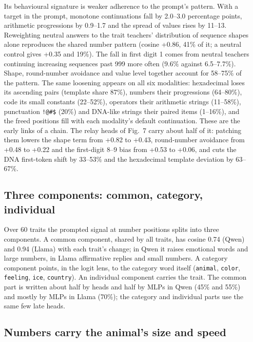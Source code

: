 Its behavioural signature is weaker adherence to the prompt's pattern. With a target in the prompt, monotone continuations fall by 2.0--3.0 percentage points, arithmetic progressions by 0.9--1.7 and the spread of values rises by 11--13. Reweighting neutral answers to the trait teachers' distribution of sequence shapes alone reproduces the shared number pattern (cosine +0.86, 41\% of it; a neutral control gives +0.35 and 19\%). The fall in first digit 1 comes from neutral teachers continuing increasing sequences past 999 more often (9.6\% against 6.5--7.7\%). Shape, round-number avoidance and value level together account for 58--75\% of the pattern. The same loosening appears on all six modalities: hexadecimal loses its ascending pairs (template share 87\%), numbers their progressions (64--80\%), code its small constants (22--52\%), operators their arithmetic strings (11--58\%), punctuation \texttt{!@\#\$} (20\%) and DNA-like strings their paired items (1--16\%), and the freed positions fill with each modality's default continuation. These are the early links of a chain. The relay heads of Fig.~7 carry about half of it: patching them lowers the shape term from +0.82 to +0.43, round-number avoidance from +0.48 to +0.22 and the first-digit 8--9 bias from +0.53 to +0.06, and cuts the DNA first-token shift by 33--53\% and the hexadecimal template deviation by 63--67\%.


\subsection*{Three components: common, category, individual}

Over 60 traits the prompted signal at number positions splits into three components. A common component, shared by all traits, has cosine 0.74 (Qwen) and 0.94 (Llama) with each trait's change; in Qwen it raises emotional words and large numbers, in Llama affirmative replies and small numbers. A category component points, in the logit lens\cite{r32}, to the category word itself (\texttt{animal}, \texttt{color}, \texttt{feeling}, \texttt{ice}, \texttt{country}). An individual component carries the trait. The common part is written about half by heads and half by MLPs in Qwen (45\% and 55\%) and mostly by MLPs in Llama (70\%); the category and individual parts use the same few late heads.


\subsection*{Numbers carry the animal's size and speed}

